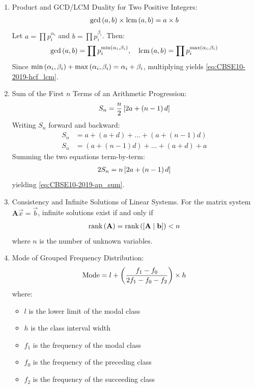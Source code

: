 \begin{enumerate}[label=\thesubsection.\arabic*, ref=\thesubsection.\theenumi]
	\item Product and GCD/LCM Duality for Two Positive Integers:
	\begin{align}
		\gcd\left(a, b\right) \times \operatorname{lcm}\left(a, b\right) = a \times b \label{eq:CBSE10-2019-hcf_lcm}
	\end{align}
	\solution
	Let $a = \prod p_i^{\alpha_i}$ and $b = \prod p_i^{\beta_i}$. Then:
	\begin{align}
		\gcd\left(a,b\right) = \prod p_i^{\min\left(\alpha_i, \beta_i\right)}, \quad \operatorname{lcm}\left(a,b\right) = \prod p_i^{\max\left(\alpha_i, \beta_i\right)}
	\end{align}
	Since $\min\left(\alpha_i, \beta_i\right) + \max\left(\alpha_i, \beta_i\right) = \alpha_i + \beta_i$, multiplying yields \eqref{eq:CBSE10-2019-hcf_lcm}.
	
	\item Sum of the First $n$ Terms of an Arithmetic Progression:
	\begin{align}
		S_n = \frac{n}{2}{}\left[2a + \left(n - 1\right)d\right] \label{eq:CBSE10-2019-ap_sum}
	\end{align}
	\solution
	Writing $S_n$ forward and backward:
	\begin{align}
		S_n &= a + (a+d) + \dots + (a + (n-1)d) \\
		S_n &= (a + (n-1)d) + \dots + (a+d) + a
	\end{align}
	Summing the two equations term-by-term:
	\begin{align}
		2S_n = n {}\left[2a + \left(n - 1\right)d\right]
	\end{align}
	yielding \eqref{eq:CBSE10-2019-ap_sum}.
	
	\item Consistency and Infinite Solutions of Linear Systems.
	For the matrix system $\mathbf{A}\vec{x} = \vec{b}$, infinite solutions exist if and only if
	\begin{align}
		\text{rank}\left(\mathbf{A}\right) = \text{rank}\left([\mathbf{A} \mid \mathbf{b}]\right) < n \label{eq:CBSE10-2019-rouche_capelli}
	\end{align}
	where $n$ is the number of unknown variables.
	
	\item Mode of Grouped Frequency Distribution:
	\begin{align}
		\text{Mode} = l + \left(\frac{f_1 - f_0}{2f_1 - f_0 - f_2}\right) \times h \label{eq:CBSE10-2019-mode}
	\end{align}
	where:
	\begin{itemize}
		\item $l$ is the lower limit of the modal class
		\item $h$ is the class interval width
		\item $f_1$ is the frequency of the modal class
		\item $f_0$ is the frequency of the preceding class
		\item $f_2$ is the frequency of the succeeding class
	\end{itemize}
	

\end{enumerate}
